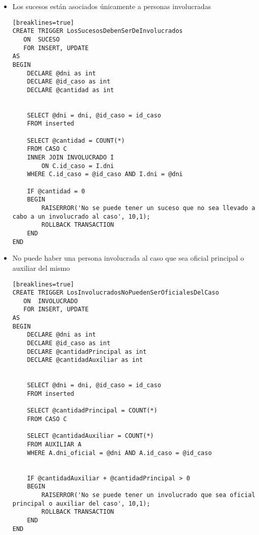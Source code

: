 \begin{itemize}
\begin{verbatim}[breaklines=true]
    SELECT @dni = I.dni, @id_caso = E.id_caso
	FROM inserted I
	INNER JOIN ESTADO E
		ON I.id_estado = E.id_estado


	SELECT @cantidad = COUNT(*) 
	FROM CASO C
	INNER JOIN INVOLUCRADO I
		ON C.id_caso = I.dni
	WHERE C.id_caso = @id_caso AND I.dni = @dni

	IF @cantidad = 0
	BEGIN
		RAISERROR('No se puede tener un culpable que no sea un involucrado del caso', 10,1);
		ROLLBACK TRANSACTION
	END
END
\end{verbatim}

\item Los sucesos están asociados únicamente a personas involucradas\\
\begin{verbatim}[breaklines=true]
CREATE TRIGGER LosSucesosDebenSerDeInvolucrados
   ON  SUCESO
   FOR INSERT, UPDATE
AS 
BEGIN
	DECLARE @dni as int
	DECLARE @id_caso as int	
	DECLARE @cantidad as int
	

    SELECT @dni = dni, @id_caso = id_caso
	FROM inserted

	SELECT @cantidad = COUNT(*) 
	FROM CASO C
	INNER JOIN INVOLUCRADO I
		ON C.id_caso = I.dni
	WHERE C.id_caso = @id_caso AND I.dni = @dni

	IF @cantidad = 0
	BEGIN
		RAISERROR('No se puede tener un suceso que no sea llevado a cabo a un involucrado al caso', 10,1);
		ROLLBACK TRANSACTION
	END
END
\end{verbatim}

\item No puede haber una persona involucrada al caso que sea oficial principal o auxiliar del mismo\\
\begin{verbatim}[breaklines=true]
CREATE TRIGGER LosInvolucradosNoPuedenSerOficialesDelCaso
   ON  INVOLUCRADO
   FOR INSERT, UPDATE
AS 
BEGIN
	DECLARE @dni as int
	DECLARE @id_caso as int	
	DECLARE @cantidadPrincipal as int
	DECLARE @cantidadAuxiliar as int
	

    SELECT @dni = dni, @id_caso = id_caso
	FROM inserted

	SELECT @cantidadPrincipal = COUNT(*) 
	FROM CASO C

	SELECT @cantidadAuxiliar = COUNT(*)
	FROM AUXILIAR A
	WHERE A.dni_oficial = @dni AND A.id_caso = @id_caso


	IF @cantidadAuxiliar + @cantidadPrincipal > 0
	BEGIN
		RAISERROR('No se puede tener un involucrado que sea oficial principal o auxiliar del caso', 10,1);
		ROLLBACK TRANSACTION
	END
END
\end{verbatim}
\end{itemize}
